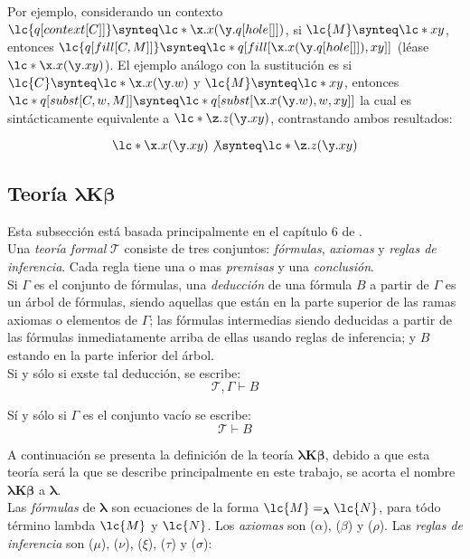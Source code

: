 Por ejemplo, considerando un contexto \(\lc{q[context[C]]} \synteq
\lc*{\x.x(\y.q[hole[]])}\), si \(\lc{M} \synteq \lc*{x y}\), entonces
\(\lc{q[fill[C,M]]} \synteq \lc*{q[fill[\x.x(\y.q[hole[]]), x y]]}\) (léase
\(\lc*{\x.x(\y.x y)}\)). El ejemplo análogo con la sustitución es si \(\lc{C}
\synteq \lc*{\x.x(\y.w)}\) y \(\lc{M} \synteq \lc*{x y}\), entonces
\(\lc*{q[subst[C,w,M]]} \synteq \lc*{q[subst[\x.x(\y.w),w,x y]]}\) la cual es
sintácticamente equivalente a \(\lc*{\z.z(\y.x y)}\), contrastando ambos
resultados:

\[\lc*{\x.x(\y.x y)} \not\synteq \lc*{\z.z(\y.x y)}\]


\subsection{Teoría \texorpdfstring{\(\boldsymbol{\lambda K \beta}\)}{\lambda K
    \beta}}

Esta subsección está basada principalmente en el capítulo 6 de
\cite{HindleySeldin:LambdaCalculusAndCombinators}. \\

Una \emph{teoría formal} \(\mathcal{T}\) consiste de tres conjuntos:
\emph{fórmulas}, \emph{axiomas} y \emph{reglas de inferencia}. Cada regla
tiene una o mas \emph{premisas} y una \emph{conclusión}. \\

Si \(\Gamma\) es el conjunto de fórmulas, una \emph{deducción} de una fórmula
\(B\) a partir de \(\Gamma\) es un árbol de fórmulas, siendo aquellas que están
en la parte superior de las ramas axiomas o elementos de \(\Gamma\); las
fórmulas intermedias siendo deducidas a partir de las fórmulas inmediatamente
arriba de ellas usando reglas de inferencia; y \(B\) estando en la parte
inferior del árbol. \\

Si y sólo si exste tal deducción, se escribe:
\[\mathcal{T},\Gamma \vdash B\]

Sí y sólo si \(\Gamma\) es el conjunto vacío se escribe:
\[\mathcal{T} \vdash B\]

A continuación se presenta la definición de la teoría \(\boldsymbol{\lambda K
  \beta}\), debido a que esta teoría será la que se describe principalmente en
este trabajo, se acorta el nombre \(\boldsymbol{\lambda K \beta}\) a
\(\boldsymbol{\lambda}\). \\

Las \emph{fórmulas} de \(\boldsymbol{\lambda}\) son ecuaciones de la
forma \(\lc{M}=_{\boldsymbol{\lambda}}\lc{N}\), para tódo término lambda
\(\lc{M}\) y \(\lc{N}\). Los \emph{axiomas} son (\(\alpha\)), (\(\beta\)) y
(\(\rho\)). Las \emph{reglas de inferencia} son (\(\mu\)), (\(\nu\)), (\(\xi\)),
(\(\tau\)) y (\(\sigma\)):

